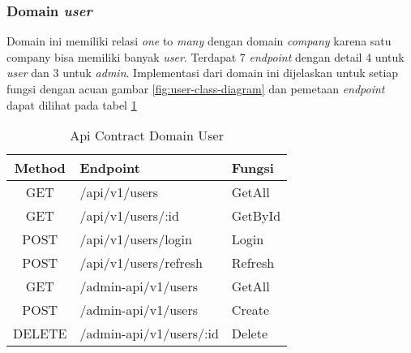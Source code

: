 \subsubsection{Domain \textit{user}}

Domain ini memiliki relasi \textit{one} to \textit{many} dengan domain \textit{company} karena satu company bisa memiliki banyak \textit{user}. Terdapat 7 \textit{endpoint} dengan detail 4 untuk \textit{user} dan 3 untuk \textit{admin}. Implementasi dari domain ini dijelaskan untuk setiap fungsi dengan acuan gambar \ref{fig:user-class-diagram} dan pemetaan \textit{endpoint} dapat dilihat pada tabel \ref{tab:api-contract-domain-user}

\bgroup
\begin{table}[htbp]
    \caption{Api Contract Domain User}
    \label{tab:api-contract-domain-user}
    \def\arraystretch{1.7}
    \centering
    \begin{tabular}{|c|p{6cm}|p{4cm}|}
        \hline
        Method & Endpoint                &
        Fungsi                                     \\
        \hline
        GET    & /api/v1/users           & GetAll  \\
        \hline
        GET    & /api/v1/users/:id       & GetById \\
        \hline
        POST   & /api/v1/users/login     & Login   \\
        \hline
        POST   & /api/v1/users/refresh   & Refresh \\
        \hline
        GET    & /admin-api/v1/users     & GetAll  \\
        \hline
        POST   & /admin-api/v1/users     & Create  \\
        \hline
        DELETE & /admin-api/v1/users/:id & Delete  \\
        \hline
    \end{tabular}
\end{table}
\egroup

\pagebreak


